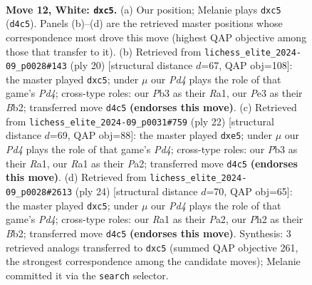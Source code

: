 \documentclass[11pt]{article}
\begin{document}
\clearpage

\begin{figure}[p]\centering
\begin{subfigure}{0.46\textwidth}\centering
\resizebox{\linewidth}{!}{%
\newchessgame
\chessboard[
  setfen={2bq1rk1/1p2bp1p/r1n2np1/p1pp4/P2P4/1P2PNP1/5PBP/RNBQ1RK1 w - - 1 12},
  showmover=false,
  pgfstyle=straightmove, color=movearrow, markmove={d4-c5}
]}
\caption{}
\end{subfigure}\hfill
\begin{subfigure}{0.46\textwidth}\centering
\resizebox{\linewidth}{!}{%
\newchessgame
\chessboard[
  setfen={r2q1rk1/pb2bppp/1pn1p3/2pn4/3P4/NP3NP1/PB2PPBP/R2Q1RK1 w - - 2 11},
  showmover=false,
  pgfstyle=straightmove, color=movearrow, markmove={d4-c5}
]}
\caption{}
\end{subfigure}
\\[4pt]
\begin{subfigure}{0.46\textwidth}\centering
\resizebox{\linewidth}{!}{%
\newchessgame
\chessboard[
  setfen={r1bq1rk1/pp3pbp/1nn3p1/3pp3/3P4/2N1PNP1/PP3PBP/R1BQ1RK1 w - - 0 12},
  showmover=false,
  pgfstyle=straightmove, color=movearrow, markmove={d4-e5}
]}
\caption{}
\end{subfigure}\hfill
\begin{subfigure}{0.46\textwidth}\centering
\resizebox{\linewidth}{!}{%
\newchessgame
\chessboard[
  setfen={2rqr1k1/pb1nbppp/1p3n2/2pp4/3P4/1PN1PNP1/PB3PBP/2RQ1RK1 w - - 5 13},
  showmover=false,
  pgfstyle=straightmove, color=movearrow, markmove={d4-c5}
]}
\caption{}
\end{subfigure}
\caption{\textbf{Move 12, White: \texttt{dxc5}.} (a) Our position; Melanie plays \texttt{dxc5} (\texttt{d4c5}). Panels (b)--(d) are the retrieved master positions whose correspondence most drove this move (highest QAP objective among those that transfer to it). (b) Retrieved from \texttt{lichess\_elite\_2024-09\_p0028\#143} (ply 20) [structural distance $d$=67, QAP obj=108]: the master played \texttt{dxc5}; under $\mu$ our \emph{Pd4} plays the role of that game's \emph{Pd4}; cross-type roles: our \emph{P}b3 as their \emph{R}a1, our \emph{P}e3 as their \emph{B}b2; transferred move \texttt{d4c5} \textbf{(endorses this move)}. (c) Retrieved from \texttt{lichess\_elite\_2024-09\_p0031\#759} (ply 22) [structural distance $d$=69, QAP obj=88]: the master played \texttt{dxe5}; under $\mu$ our \emph{Pd4} plays the role of that game's \emph{Pd4}; cross-type roles: our \emph{P}b3 as their \emph{R}a1, our \emph{R}a1 as their \emph{P}a2; transferred move \texttt{d4c5} \textbf{(endorses this move)}. (d) Retrieved from \texttt{lichess\_elite\_2024-09\_p0028\#2613} (ply 24) [structural distance $d$=70, QAP obj=65]: the master played \texttt{dxc5}; under $\mu$ our \emph{Pd4} plays the role of that game's \emph{Pd4}; cross-type roles: our \emph{R}a1 as their \emph{P}a2, our \emph{P}h2 as their \emph{B}b2; transferred move \texttt{d4c5} \textbf{(endorses this move)}. Synthesis: 3 retrieved analogs transferred to \texttt{dxc5} (summed QAP objective 261, the strongest correspondence among the candidate moves); Melanie committed it via the \texttt{search} selector.}
\label{fig:thought-m22}
\end{figure}
\end{document}

